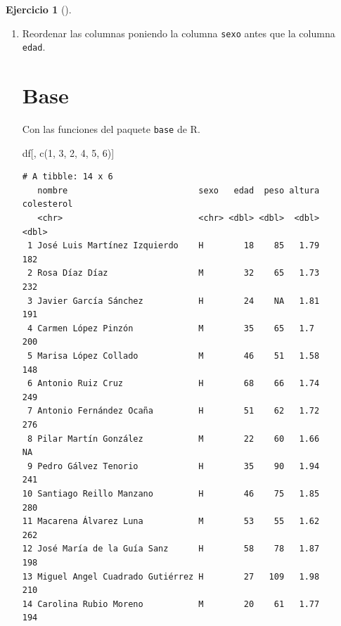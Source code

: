 \documentclass[
  spanish,
  a4paper,
]{scrreport}
\newenvironment{Shaded}{\begin{snugshade}}{\end{snugshade}}
\newcommand{\DecValTok}[1]{\textcolor[rgb]{0.68,0.00,0.00}{#1}}
\newcommand{\FunctionTok}[1]{\textcolor[rgb]{0.28,0.35,0.67}{#1}}
\newcommand{\NormalTok}[1]{\textcolor[rgb]{0.00,0.23,0.31}{#1}}
\theoremstyle{definition}
\newtheorem{exercise}{Ejercicio}[chapter]
\theoremstyle{remark}
\begin{document}
\begin{exercise}[]
\begin{enumerate}
\begin{tcolorbox}
  \end{tcolorbox}
\item
  Reordenar las columnas poniendo la columna \texttt{sexo} antes que la
  columna \texttt{edad}.

  \begin{tcolorbox}[enhanced jigsaw, titlerule=0mm, arc=.35mm, rightrule=.15mm, opacitybacktitle=0.6, leftrule=.75mm, colframe=quarto-callout-tip-color-frame, toptitle=1mm, breakable, colbacktitle=quarto-callout-tip-color!10!white, bottomrule=.15mm, colback=white, left=2mm, bottomtitle=1mm, opacityback=0, title=\textcolor{quarto-callout-tip-color}{\faLightbulb}\hspace{0.5em}{Solución}, toprule=.15mm, coltitle=black]

  \section{Base}

  Con las funciones del paquete \texttt{base} de R.

\begin{Shaded}
\begin{Highlighting}[]
\NormalTok{df[, }\FunctionTok{c}\NormalTok{(}\DecValTok{1}\NormalTok{, }\DecValTok{3}\NormalTok{, }\DecValTok{2}\NormalTok{, }\DecValTok{4}\NormalTok{, }\DecValTok{5}\NormalTok{, }\DecValTok{6}\NormalTok{)]}
\end{Highlighting}
\end{Shaded}

\begin{verbatim}
# A tibble: 14 x 6
   nombre                          sexo   edad  peso altura colesterol
   <chr>                           <chr> <dbl> <dbl>  <dbl>      <dbl>
 1 José Luis Martínez Izquierdo    H        18    85   1.79        182
 2 Rosa Díaz Díaz                  M        32    65   1.73        232
 3 Javier García Sánchez           H        24    NA   1.81        191
 4 Carmen López Pinzón             M        35    65   1.7         200
 5 Marisa López Collado            M        46    51   1.58        148
 6 Antonio Ruiz Cruz               H        68    66   1.74        249
 7 Antonio Fernández Ocaña         H        51    62   1.72        276
 8 Pilar Martín González           M        22    60   1.66         NA
 9 Pedro Gálvez Tenorio            H        35    90   1.94        241
10 Santiago Reillo Manzano         H        46    75   1.85        280
11 Macarena Álvarez Luna           M        53    55   1.62        262
12 José María de la Guía Sanz      H        58    78   1.87        198
13 Miguel Angel Cuadrado Gutiérrez H        27   109   1.98        210
14 Carolina Rubio Moreno           M        20    61   1.77        194
\end{verbatim}


\end{tcolorbox}
\end{enumerate}
\end{exercise}
\end{document}
